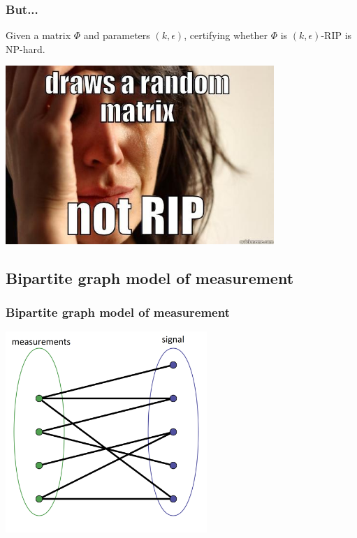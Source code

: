 \documentclass[aspectratio=34]{beamer}
\theoremstyle{plain}
\begin{document}
\begin{frame}
\frametitle{But...}
\begin{theorem}
Given a matrix $\Phi$ and parameters $(k,\epsilon)$, certifying whether $\Phi$ is $(k,\epsilon)$-RIP is NP-hard. 
\end{theorem}
\end{frame}

\begin{frame}
\includegraphics[width=4in]{rip.jpg}
\end{frame}


\subsection{Bipartite graph model of measurement}
\begin{frame}
\frametitle{Bipartite graph model of measurement}	
\includegraphics[width=3in]{bpgraph.png}
\end{frame}
\end{document}
